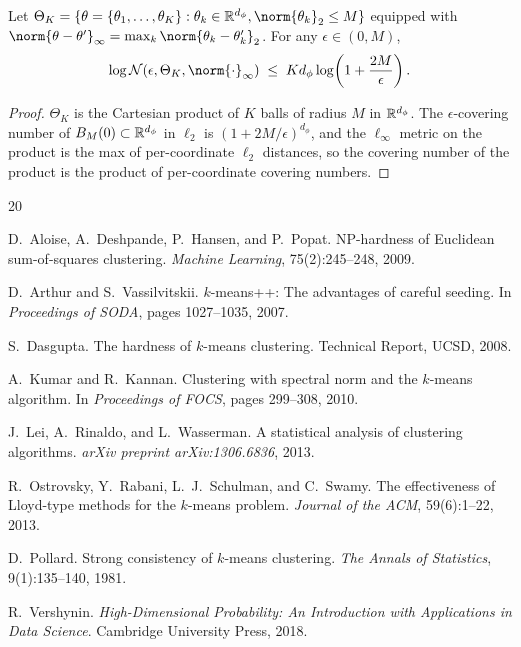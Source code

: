 \begin{lemma}
\label{lem:S5:covering}
Let $\Theta_K=\{\theta=\{\theta_1,\dots,\theta_K\}:\theta_k\in\R^{d_\phi},
\norm{\theta_k}_2\le M\}$ equipped with
$\norm{\theta-\theta'}_\infty=\max_k\norm{\theta_k-\theta'_k}_2$.
For any $\epsilon\in(0,M)$,
\[
\log\mathcal{N}(\epsilon,\Theta_K,\norm{\cdot}_\infty)
\;\le\; K d_\phi\log\!\left(1+\frac{2M}{\epsilon}\right).
\]
\end{lemma}

\begin{proof}
$\Theta_K$ is the Cartesian product of $K$ balls of radius $M$ in
$\mathbb{R}^{d_\phi}$.  The $\epsilon$-covering number of $B_M(0)\subset\mathbb{R}^{d_\phi}$
in $\ell_2$ is $(1+2M/\epsilon)^{d_\phi}$, and the $\ell_\infty$ metric
on the product is the max of per-coordinate $\ell_2$ distances, so the
covering number of the product is the product of per-coordinate covering
numbers.
\end{proof}

\begin{thebibliography}{20}

D.~Aloise, A.~Deshpande, P.~Hansen, and P.~Popat.
NP-hardness of Euclidean sum-of-squares clustering.
\emph{Machine Learning}, 75(2):245--248, 2009.

D.~Arthur and S.~Vassilvitskii.
$k$-means++: The advantages of careful seeding.
In \emph{Proceedings of SODA}, pages 1027--1035, 2007.

S.~Dasgupta.
The hardness of $k$-means clustering.
Technical Report, UCSD, 2008.

A.~Kumar and R.~Kannan.
Clustering with spectral norm and the $k$-means algorithm.
In \emph{Proceedings of FOCS}, pages 299--308, 2010.

J.~Lei, A.~Rinaldo, and L.~Wasserman.
A statistical analysis of clustering algorithms.
\emph{arXiv preprint arXiv:1306.6836}, 2013.

R.~Ostrovsky, Y.~Rabani, L.~J.~Schulman, and C.~Swamy.
The effectiveness of Lloyd-type methods for the $k$-means problem.
\emph{Journal of the ACM}, 59(6):1--22, 2013.

D.~Pollard.
Strong consistency of $k$-means clustering.
\emph{The Annals of Statistics}, 9(1):135--140, 1981.

R.~Vershynin.
\emph{High-Dimensional Probability: An Introduction with Applications in
Data Science}. Cambridge University Press, 2018.

\end{thebibliography}
